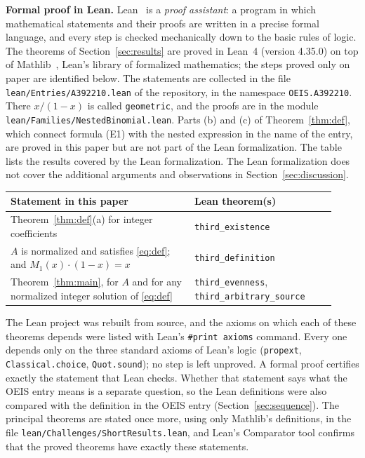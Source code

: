 \documentclass[11pt,a4paper]{article}
\theoremstyle{definition}
\theoremstyle{remark}
\newcommand{\para}[1]{\par\medskip\noindent\textbf{#1}\enspace}
\begin{document}
\para{Formal proof in Lean.}
Lean~\cite{lean} is a \emph{proof assistant}: a program in which mathematical statements and their proofs are written
in a precise formal language, and every step is checked mechanically down to the basic rules of logic. The theorems of Section~\ref{sec:results} are proved in Lean~4 (version 4.35.0) on top of
Mathlib~\cite{mathlib}, Lean's library of formalized mathematics; the steps proved only on paper are identified below. The statements are collected in the file \texttt{lean/Entries/A392210.lean} of the repository,
in the namespace \texttt{OEIS.A392210}. There $x/(1-x)$ is called \texttt{geometric}, and the proofs are in the module \texttt{lean/Families/NestedBinomial.lean}. Parts (b) and (c) of Theorem~\ref{thm:def}, which connect formula (E1) with the nested expression in the name of the entry, are proved in this paper but are not part of the Lean formalization.
The table lists the results covered by the Lean formalization. The Lean formalization does not cover the additional arguments and observations in Section~\ref{sec:discussion}.
\begin{center}\small\renewcommand{\arraystretch}{1.25}
\begin{tabular}{>{\raggedright\arraybackslash}p{0.52\linewidth}>{\raggedright\arraybackslash}p{0.4\linewidth}}
\toprule
Statement in this paper & Lean theorem(s)\\
\midrule
Theorem~\ref{thm:def}(a) for integer coefficients & \texttt{third\_\allowbreak{}existence} \\
$A$ is normalized and satisfies \eqref{eq:def}; and $M_1(x)\cdot(1-x)=x$ & \texttt{third\_\allowbreak{}definition} \\
Theorem~\ref{thm:main}, for $A$ and for any normalized integer solution of \eqref{eq:def} & \texttt{third\_\allowbreak{}evenness}, \texttt{third\_\allowbreak{}arbitrary\_\allowbreak{}source} \\
\bottomrule
\end{tabular}
\end{center}
The Lean project was rebuilt from source, and the axioms on which each of these theorems depends were listed with
Lean's \texttt{\#print axioms} command. Every one depends only on the three standard axioms of Lean's logic
(\texttt{propext}, \texttt{Classical.choice}, \texttt{Quot.sound}); no step is left unproved. A formal proof certifies
exactly the statement that Lean checks. Whether that statement says what the OEIS entry means is a separate question,
so the Lean definitions were also compared with the definition in the OEIS entry
(Section~\ref{sec:sequence}). The principal theorems are stated once more, using only Mathlib's definitions, in the
file \texttt{lean/Challenges/ShortResults.lean}, and Lean's Comparator tool confirms that the
proved theorems have exactly these statements.
\end{document}
